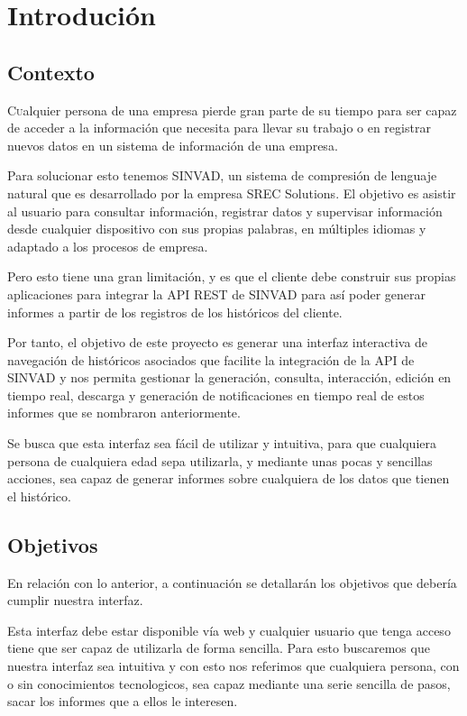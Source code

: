 \chapter{Introdución}
\label{chap:introducion}

\section{Contexto}

\lettrine Cualquier persona de una empresa pierde gran parte de su tiempo para ser capaz de acceder a la información 
que necesita para llevar su trabajo o en registrar nuevos datos en un sistema de información de una empresa. 

Para solucionar esto tenemos SINVAD, un sistema de compresión de lenguaje natural que es desarrollado por la empresa SREC Solutions. 
El objetivo es asistir al usuario para consultar información, registrar datos y supervisar información desde cualquier dispositivo con sus propias palabras, 
en múltiples idiomas y adaptado a los procesos de empresa.

Pero esto tiene una gran limitación, y es que el cliente debe construir sus propias aplicaciones para integrar la API REST de 
SINVAD para así poder generar informes a partir de los registros de los históricos del cliente.

Por tanto, el objetivo de este proyecto es generar una interfaz interactiva de navegación de históricos asociados que 
facilite la integración de la API de SINVAD y nos permita gestionar la generación, consulta, interacción, edición en tiempo real, 
descarga y generación de notificaciones en tiempo real de estos informes que se nombraron anteriormente.

Se busca que esta interfaz sea fácil de utilizar y intuitiva, para que cualquiera persona de cualquiera edad sepa utilizarla, 
y mediante unas pocas y sencillas acciones, sea capaz de generar informes sobre cualquiera de los datos que tienen el histórico.

\section{Objetivos}

En relación con lo anterior, a continuación se detallarán los objetivos que debería cumplir nuestra interfaz.

Esta interfaz debe estar disponible vía web y cualquier usuario que tenga acceso tiene que ser capaz de utilizarla de forma sencilla.
Para esto buscaremos que nuestra interfaz sea intuitiva y con esto nos referimos que cualquiera persona, con o sin conocimientos tecnologicos,
sea capaz mediante una serie sencilla de pasos, sacar los informes que a ellos le interesen.

